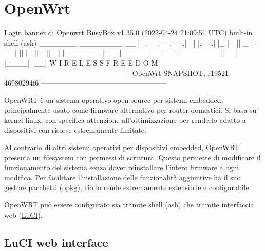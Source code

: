 \section{OpenWrt \ok}

\begin{bashcode}{Login banner di Openwrt}{}
BusyBox v1.35.0 (2022-04-24 21:09:51 UTC) built-in shell (ash)
_______                     ________        __
|       |.-----.-----.-----.|  |  |  |.----.|  |_
|   -   ||  _  |  -__|     ||  |  |  ||   _||   _|
|_______||   __|_____|__|__||________||__|  |____|
|__| W I R E L E S S   F R E E D O M
-----------------------------------------------------
OpenWrt SNAPSHOT, r19521-46980294f6
-----------------------------------------------------
\end{bashcode}

OpenWRT è un sistema operativo open-source per sistemi embedded, principalmente usato come firmware alternativo per router domestici. Si basa su kernel linux, con specifica attenzione all'ottimizzazione per renderlo adatto a dispositivi con risorse estremamente limitate.

Al contrario di altri sistemi operativi per dispositivi embedded, OpenWRT presenta un filesystem con permessi di scrittura. Questo permette di modificare il funzionamento del sistema senza dover reinstallare l'intero firmware a ogni modifica. Per facilitare l'installazione delle funzionalità aggiuntive ha il suo gestore pacchetti (\href{https://openwrt.org/docs/guide-user/additional-software/opkg}{opkg}), ciò lo rende estremamente estensibile e configurabile.

OpenWRT può essere configurato sia tramite shell (\href{https://en.wikipedia.org/wiki/Almquist_shell}{ash}) che tramite interfaccia web (\href{https://openwrt.org/docs/guide-user/luci/start}{LuCI}).


\subsection{LuCI web interface \ok}
\label{subsec:luci-web-interface}

